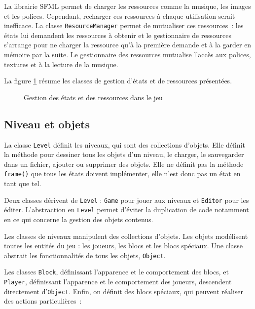 La librairie SFML permet de charger les ressources comme la musique,
les images et les polices. Cependant, recharger ces ressources à chaque
utilisation serait inefficace. La classe \texttt{ResourceManager} permet
de mutualiser ces ressources~: les états lui demandent les ressources
à obtenir et le gestionnaire de ressources s'arrange pour ne charger
la ressource qu'à la première demande et à la garder en mémoire par la suite.
Le gestionnaire des ressources mutualise l'accès aux polices, textures
et à la lecture de la musique.

La figure \ref{fig:analyse-uml-state} résume les classes de gestion
d'états et de ressources présentées.

\thispagestyle{empty}
\begin{figure}[p!]
    \centering
    
    \caption{Gestion des états et des ressources dans le jeu}
    \label{fig:analyse-uml-state}
\end{figure}
\restoregeometry

\subsection{Niveau et objets}

La classe \texttt{Level} définit les niveaux, qui sont des collections
d'objets. Elle définit la méthode pour dessiner tous les objets d'un niveau,
le charger, le sauvegarder dans un fichier, ajouter ou supprimer des objets.
Elle ne définit pas la méthode \texttt{frame()} que tous les états doivent
implémenter, elle n'est donc pas un état en tant que tel.

Deux classes dérivent de \texttt{Level} : \texttt{Game} pour jouer aux
niveaux et \texttt{Editor} pour les éditer. L'abstraction en
\texttt{Level} permet d'éviter la duplication de code notamment en
ce qui concerne la gestion des objets contenus.

Les classes de niveaux manipulent des collections d'objets. Les objets
modélisent toutes les entités du jeu : les joueurs, les blocs et les
blocs spéciaux. Une classe abstrait les fonctionnalités de tous les objets,
\texttt{Object}.

Les classes \texttt{Block}, définissant l'apparence et le comportement
des blocs, et \texttt{Player}, définissant l'apparence et le comportement
des joueurs, descendent directement d'\texttt{Object}. Enfin, on définit
des blocs spéciaux, qui peuvent réaliser des actions particulières~:

